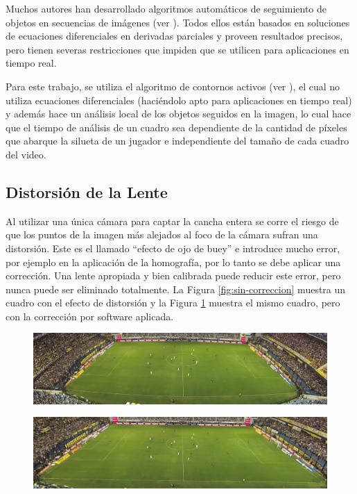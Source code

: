 Muchos autores han desarrollado algoritmos automáticos de seguimiento de
objetos en secuencias de imágenes (ver \cite{IFTrace, alp, local-learning,
MHT-2}). Todos ellos están basados en soluciones de ecuaciones diferenciales en
derivadas parciales y proveen resultados precisos, pero tienen severas
restricciones que impiden que se utilicen para aplicaciones en tiempo real.

Para este trabajo, se utiliza el algoritmo de contornos activos (ver
\cite{fast-level-set}), el cual no utiliza ecuaciones diferenciales (haciéndolo
apto para aplicaciones en tiempo real) y además hace un análisis local de los
objetos seguidos en la imagen, lo cual hace que el tiempo de análisis de un
cuadro sea dependiente de la cantidad de píxeles que abarque la silueta de un
jugador e independiente del tamaño de cada cuadro del video.

\subsection{Distorsión de la Lente}

Al utilizar una única cámara para captar la cancha entera se corre el riesgo de
que los puntos de la imagen más alejados al foco de la cámara sufran una
distorsión. Este es el llamado ``efecto de ojo de buey'' e introduce mucho
error, por ejemplo en la aplicación de la homografía, por lo tanto se debe
aplicar una corrección. Una lente apropiada y bien calibrada puede reducir este
error, pero nunca puede ser eliminado totalmente. La Figura
\ref{fig:sin-correccion} muestra un cuadro con el efecto de distorsión y la
Figura \ref{fig:con-correccion} muestra el mismo cuadro, pero con la corrección
por software aplicada.

\begin{figure}[H]
    \centering
    \includegraphics[width=.8\linewidth]{./images/sin-correccion.png}
    \label{fig:sin-correccion}
\begin{figure}[H]
\end{figure}
    \centering
    \includegraphics[width=.8\linewidth]{./images/con-correccion.png}
    \label{fig:con-correccion}
\end{figure}


